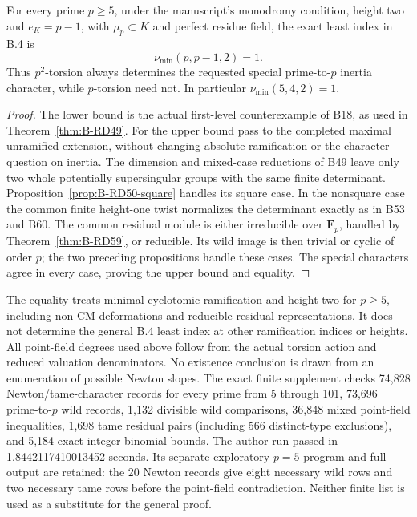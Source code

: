 \begin{theorem}
\label{thm:B-RD61}
For every prime $p\ge5$, under the manuscript's monodromy condition,
height two and $e_K=p-1$, with $\mu_p\subset K$ and perfect residue
field, the exact least index in B.4 is
\[
                         \nu_{\min}(p,p-1,2)=1.         \tag{B-RD61.4}
\]
Thus $p^2$-torsion always determines the requested special
prime-to-$p$ inertia character, while $p$-torsion need not.
In particular $\nu_{\min}(5,4,2)=1$.
\end{theorem}
\begin{proof}
The lower bound is the actual first-level counterexample of B18,
as used in Theorem~\ref{thm:B-RD49}. For the upper bound pass to
the completed maximal unramified extension, without changing
absolute ramification or the character question on inertia.
The dimension and mixed-case reductions of B49 leave only two
whole potentially supersingular groups with the same finite
determinant. Proposition~\ref{prop:B-RD50-square} handles its
square case. In the nonsquare case the common finite height-one
twist normalizes the determinant exactly as in B53 and B60.
The common residual module is either irreducible over $\mathbf F_p$,
handled by Theorem~\ref{thm:B-RD59}, or reducible. Its wild image
is then trivial or cyclic of order $p$; the two preceding
propositions handle these cases. The special characters agree
in every case, proving the upper bound and equality.
\end{proof}

\begin{remark}
\label{rem:B-RD61-scope}
The equality treats minimal cyclotomic ramification and height two
for $p\ge5$, including non-CM deformations and reducible residual
representations. It does not determine the general B.4 least index
at other ramification indices or heights. All point-field degrees
used above follow from the actual torsion action and reduced
valuation denominators. No existence conclusion is drawn from
an enumeration of possible Newton slopes.
The exact finite supplement
checks 74,828 Newton/tame-character records for every prime from
5 through 101, 73,696 prime-to-$p$ wild records, 1,132 divisible
wild comparisons, 36,848 mixed point-field inequalities, 1,698
tame residual pairs (including 566 distinct-type exclusions), and
5,184 exact integer-binomial bounds. The author run passed in
1.8442117410013452 seconds. Its separate exploratory $p=5$ program
and full output are retained: the 20 Newton records give eight
necessary wild rows and two necessary tame rows before the
point-field contradiction. Neither finite list is used as a
substitute for the general proof.
\end{remark}
